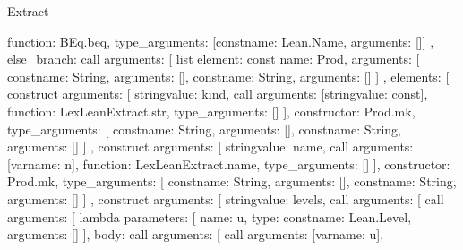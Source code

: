 \begin{lexlean}{Extract}
\begin{toolingmodule}
{{{{{{{                  function: BEq.beq,
                  type_arguments: [const{name: Lean.Name, arguments: []}]
                },
                else_branch: call{
                  arguments: [
                    list{
                      element: const{
                        name: Prod,
                        arguments: [
                          const{name: String, arguments: []},
                          const{name: String, arguments: []}
                        ]
                      },
                      elements: [
                        construct{
                          arguments: [
                            string{value: kind},
                            call{
                              arguments: [string{value: const}],
                              function: LexLeanExtract.str,
                              type_arguments: []
                            }
                          ],
                          constructor: Prod.mk,
                          type_arguments: [
                            const{name: String, arguments: []},
                            const{name: String, arguments: []}
                          ]
                        },
                        construct{
                          arguments: [
                            string{value: name},
                            call{
                              arguments: [var{name: n}],
                              function: LexLeanExtract.name,
                              type_arguments: []
                            }
                          ],
                          constructor: Prod.mk,
                          type_arguments: [
                            const{name: String, arguments: []},
                            const{name: String, arguments: []}
                          ]
                        },
                        construct{
                          arguments: [
                            string{value: levels},
                            call{
                              arguments: [
                                call{
                                  arguments: [
                                    lambda{
                                      parameters: [
                                        {name: u, type: const{name: Lean.Level, arguments: []}}
                                      ],
                                      body: call{
                                        arguments: [
                                          call{
                                            arguments: [var{name: u}],
}}}}}}}}}}}}}}
\end{toolingmodule}
\end{lexlean}
